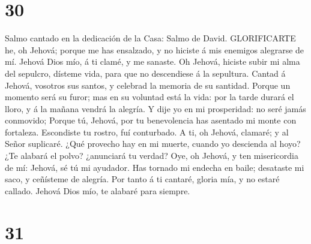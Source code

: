 \hypertarget{section-29}{%
\section{30}\label{section-29}}

 Salmo cantado en la dedicación de la Casa: Salmo de David.
GLORIFICARTE he, oh Jehová; porque me has ensalzado, y no hiciste á mis
enemigos alegrarse de mí.  Jehová Dios mío, á ti clamé, y me
sanaste.  Oh Jehová, hiciste subir mi alma del sepulcro,
dísteme vida, para que no descendiese á la sepultura. 
Cantad á Jehová, vosotros sus santos, y celebrad la memoria de su
santidad.  Porque un momento será su furor; mas en su
voluntad está la vida: por la tarde durará el lloro, y á la mañana
vendrá la alegría.  Y dije yo en mi prosperidad: no seré
jamás conmovido;  Porque tú, Jehová, por tu benevolencia has
asentado mi monte con fortaleza. Escondiste tu rostro, fuí conturbado.
 A ti, oh Jehová, clamaré; y al Señor suplicaré.
 ¿Qué provecho hay en mi muerte, cuando yo descienda al
hoyo? ¿Te alabará el polvo? ¿anunciará tu verdad?  Oye, oh
Jehová, y ten misericordia de mí: Jehová, sé tú mi ayudador.
 Has tornado mi endecha en baile; desataste mi saco, y
ceñísteme de alegría.  Por tanto á ti cantaré, gloria mía,
y no estaré callado. Jehová Dios mío, te alabaré para siempre.

\hypertarget{section-30}{%
\section{31}\label{section-30}}

